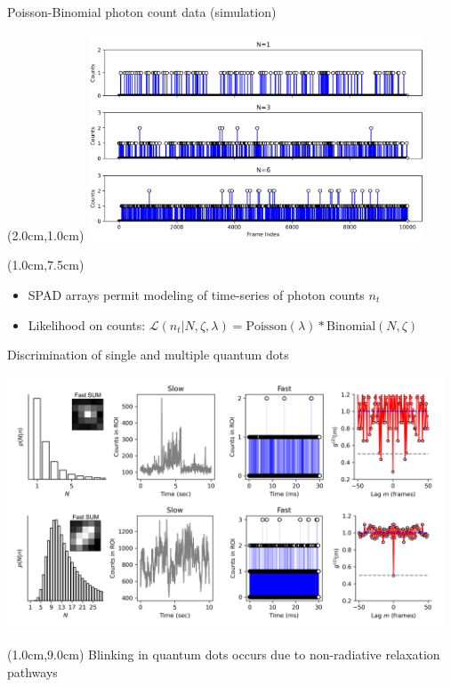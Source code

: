 \documentclass{beamer}					%
\begin{document}
\begin{frame}{Poisson-Binomial photon count data (simulation)}
\begin{textblock*}{10cm}(2.0cm,1.0cm)
\includegraphics[width=10cm]{../../spad/spad/media/Counts.png}
\end{textblock*}
\begin{textblock*}{13cm}(1.0cm,7.5cm)
\begin{itemize}
\item SPAD arrays permit modeling of time-series of photon counts $n_{t}$
\item Likelihood on counts: $\mathcal{L}(n_t\lvert N,\zeta,\lambda) = \mathrm{Poisson}(\lambda)* \mathrm{Binomial}(N,\zeta)$
\end{itemize}
\end{textblock*}

\end{frame}

\begin{frame}{Discrimination of single and multiple quantum dots}
\begin{center}
\includegraphics[width=13cm]{../../spad/spad/media/CountQD.png}
\end{center}
\begin{textblock*}{14cm}(1.0cm,9.0cm)
Blinking in quantum dots occurs due to non-radiative relaxation pathways
\end{textblock*}

\end{frame}
\end{document}
